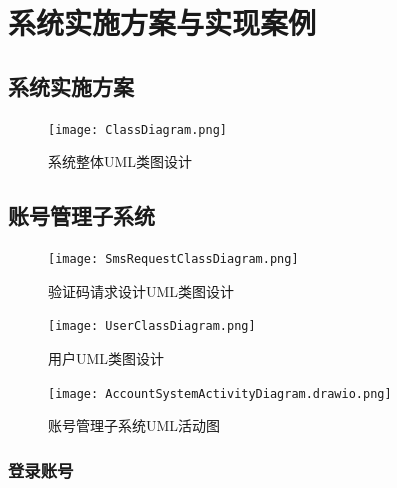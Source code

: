 \section{系统实施方案与实现案例}\label{sec:System_Implementation_Programme_and_Realisation_Cases}

\subsection{系统实施方案}

\begin{figure}[H]
	\centering
	\texttt{[image: ClassDiagram.png]}
	\caption{系统整体UML类图设计}
\end{figure}

\subsection{账号管理子系统}

\begin{figure}[H]
	\centering
	\texttt{[image: SmsRequestClassDiagram.png]}
	\caption{验证码请求设计UML类图设计}
\end{figure}

\begin{figure}[H]
	\centering
	\texttt{[image: UserClassDiagram.png]}
	\caption{用户UML类图设计}
\end{figure}

\begin{figure}[H]
	\centering
	\texttt{[image: AccountSystemActivityDiagram.drawio.png]} 
	\caption{账号管理子系统UML活动图}
	\label{fig:AccountSystemActivityDiagram}
\end{figure}

\subsubsection{登录账号}

